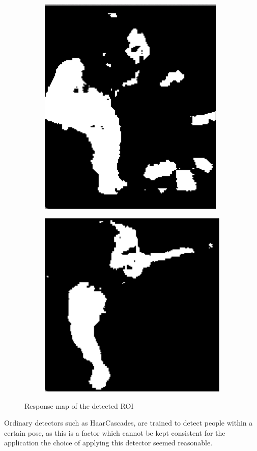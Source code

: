 \begin{figure}[H]
    \centering
    \begin{subfigure}[b]{0.3\textwidth}
    	\centering
			\includegraphics[scale=0.5]{Images/roi_response1.png}
    \end{subfigure}%
    \begin{subfigure}[b]{0.3\textwidth}
    	\centering
			\includegraphics[scale=0.5]{Images/roi_response2.png}
    \end{subfigure}
    \caption{Response map of the  detected ROI}
    \label{fig:responsemap}
\end{figure}

Ordinary detectors such as HaarCascades, are trained to detect people within a certain pose,
as this is a factor which cannot be kept consistent for the application the choice of applying this detector seemed reasonable. \\

